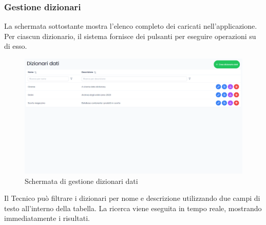 \subsubsection{Gestione dizionari}
\par La schermata sottostante mostra l'elenco completo dei  caricati nell'applicazione. Per ciascun dizionario, il sistema fornisce dei pulsanti per eseguire operazioni su di esso.
\begin{figure}[H]
  \centering
  \includegraphics[width=1\textwidth]{assets/dd_list.png}
  \caption{Schermata di gestione dizionari dati}
\end{figure}

\par Il Tecnico può filtrare i dizionari per nome e descrizione utilizzando due campi di testo all'interno della tabella. La ricerca viene eseguita in tempo reale, mostrando immediatamente i risultati.

